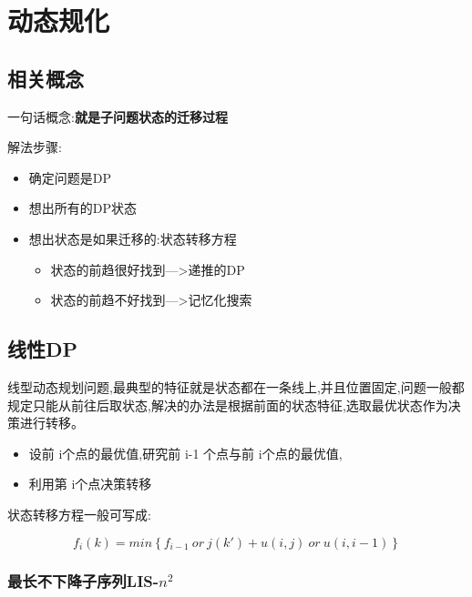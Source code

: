 \section{动态规化}

\subsection{相关概念}

一句话概念:\textbf{就是子问题状态的迁移过程}

解法步骤:

\begin{itemize}
 \item 确定问题是DP
 \item 想出所有的DP状态
 \item 想出状态是如果迁移的:状态转移方程
 \begin{itemize}
 \item 状态的前趋很好找到--->递推的DP
 \item 状态的前趋不好找到--->记忆化搜索
 \end{itemize}
\end{itemize}

\subsection{线性DP}

线型动态规划问题,最典型的特征就是状态都在一条线上,并且位置固定,问题一般都规定只能从前往后取状态,解决的办法是根据前面的状态特征,选取最优状态作为决策进行转移。 
\begin{itemize}
  \item 设前 i个点的最优值,研究前 i-1 个点与前 i个点的最优值, 
  \item 利用第 i个点决策转移 
\end{itemize}

状态转移方程一般可写成:

$$
f_i(k) = min\left \{ f_{i-1}\ or\ j( k') + u(i,j)\ or\ u(i,i-1) \right \} 
$$

\subsubsection{最长不下降子序列LIS-$n^2$}


